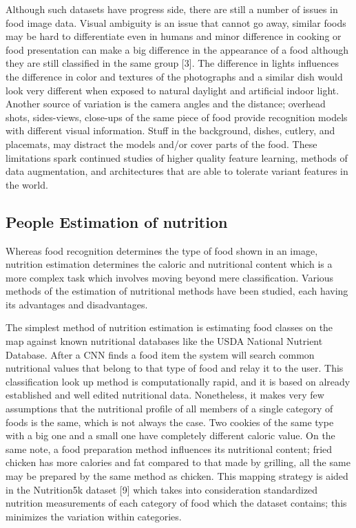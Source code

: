 \documentclass[12pt, openany]{report}
\begin{document}
Although such datasets have progress side, there are still a number of issues in food image data. Visual ambiguity is an issue that cannot go away, similar foods may be hard to differentiate even in humans and minor difference in cooking or food presentation can make a big difference in the appearance of a food although they are still classified in the same group [3]. The difference in lights influences the difference in color and textures of the photographs and a similar dish would look very different when exposed to natural daylight and artificial indoor light. Another source of variation is the camera angles and the distance; overhead shots, sides-views, close-ups of the same piece of food provide recognition models with different visual information. Stuff in the background, dishes, cutlery, and placemats, may distract the models and/or cover parts of the food. These limitations spark continued studies of higher quality feature learning, methods of data augmentation, and architectures that are able to tolerate variant features in the world.

\subsection{People Estimation of nutrition}
Whereas food recognition determines the type of food shown in an image, nutrition estimation determines the caloric and nutritional content which is a more complex task which involves moving beyond mere classification. Various methods of the estimation of nutritional methods have been studied, each having its advantages and disadvantages.

The simplest method of nutrition estimation is estimating food classes on the map against known nutritional databases like the USDA National Nutrient Database. After a CNN finds a food item the system will search common nutritional values that belong to that type of food and relay it to the user. This classification look up method is computationally rapid, and it is based on already established and well edited nutritional data. Nonetheless, it makes very few assumptions that the nutritional profile of all members of a single category of foods is the same, which is not always the case. Two cookies of the same type with a big one and a small one have completely different caloric value. On the same note, a food preparation method influences its nutritional content; fried chicken has more calories and fat compared to that made by grilling, all the same may be prepared by the same method as chicken. This mapping strategy is aided in the Nutrition5k dataset [9] which takes into consideration standardized nutrition measurements of each category of food which the dataset contains; this minimizes the variation within categories.
\end{document}
